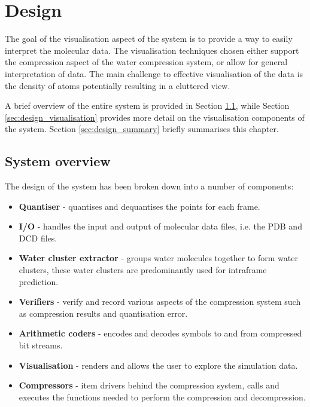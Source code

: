 \graphicspath{{./design/}}

\chapter{Design}
\label{cha:design}


The goal of the visualisation aspect of the system is to provide a way to
easily interpret the molecular data. The visualisation techniques chosen either
support the compression aspect of the water compression system, or allow for
general interpretation of data. The main challenge to effective visualisation
of the data is the density of atoms potentially resulting in a cluttered view.

A brief overview of the entire system is provided in Section
\ref{sec:design_overview}, while Section \ref{sec:design_visualisation}
provides more detail on the visualisation components of the system. Section
\ref{sec:design_summary} briefly summarises this chapter.


\section{System overview}
\label{sec:design_overview}


The design of the system has been broken down into a number of components:

\begin{itemize}

  \item \textbf{Quantiser} - quantises and dequantises the points for each
  frame.

  \item \textbf{I/O} - handles the input and output of molecular data files,
  i.e. the PDB and DCD files.

  \item \textbf{Water cluster extractor} - groups water molecules together to
  form water clusters, these water clusters are predominantly used for
  intraframe prediction.

  \item \textbf{Verifiers} - verify and record various aspects of the
  compression system such as compression results and quantisation error.

  \item \textbf{Arithmetic coders} - encodes and decodes symbols to and from
  compressed bit streams.

  \item \textbf{Visualisation} - renders and allows the user to explore the
  simulation data.

  \item \textbf{Compressors} - item drivers behind the compression system,
  calls and executes the functions needed to perform the compression and
  decompression.

\end{itemize}

